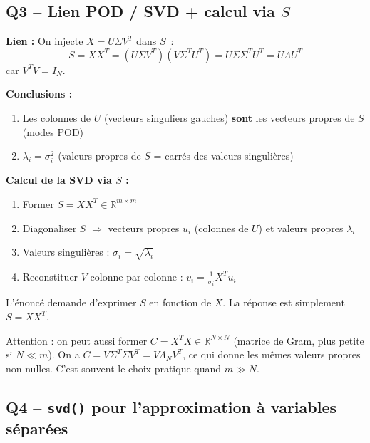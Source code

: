 \documentclass[11pt,a4paper]{article}
\begin{document}
\subsection{Q3 -- Lien POD / SVD + calcul via $S$}

\begin{formulabox}[Solution]
\textbf{Lien :} On injecte $X = U\Sigma V^T$ dans $S$~:
\[
S = XX^T = (U\Sigma V^T)(V\Sigma^T U^T) = U\Sigma\Sigma^T U^T = U\Lambda U^T
\]
car $V^TV = I_N$.

\medskip
\textbf{Conclusions :}
\begin{enumerate}[nosep]
\item Les colonnes de $U$ (vecteurs singuliers gauches) \textbf{sont} les vecteurs propres de $S$ (modes POD)
\item $\boxed{\lambda_i = \sigma_i^2}$ \quad (valeurs propres de $S$ = carr\'es des valeurs singuli\`eres)
\end{enumerate}

\textbf{Calcul de la SVD via $S$ :}
\begin{enumerate}[nosep]
\item Former $S = XX^T \in \mathbb{R}^{m\times m}$
\item Diagonaliser $S$ $\Rightarrow$ vecteurs propres $u_i$ (colonnes de $U$) et valeurs propres $\lambda_i$
\item Valeurs singuli\`eres : $\sigma_i = \sqrt{\lambda_i}$
\item Reconstituer $V$ colonne par colonne : $\displaystyle\boxed{v_i = \frac{1}{\sigma_i}X^Tu_i}$
\end{enumerate}
\end{formulabox}

\begin{warningbox}
L'\'enonc\'e demande d'exprimer $S$ en fonction de $X$. La r\'eponse est simplement $S = XX^T$.

Attention : on peut aussi former $C = X^TX \in \mathbb{R}^{N\times N}$ (matrice de Gram, plus petite si $N \ll m$). On a $C = V\Sigma^T\Sigma V^T = V\Lambda_N V^T$, ce qui donne les m\^emes valeurs propres non nulles. C'est souvent le choix pratique quand $m \gg N$.
\end{warningbox}

\subsection{Q4 -- \texttt{svd()} pour l'approximation \`a variables s\'epar\'ees}
\end{document}

